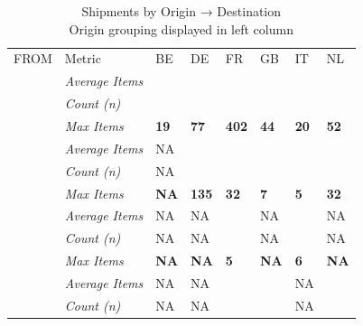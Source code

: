 \documentclass[
  american,
  10,
  a4paper,
]{book}
\theoremstyle{definition}
\theoremstyle{remark}
\begin{document}
\begin{table}
\caption*{
{\large Shipments by Origin → Destination} \\ 
{\small Origin grouping displayed in left column}
} 
\fontsize{12.0pt}{14.4pt}\selectfont
\begin{tabular*}{\linewidth}{@{\extracolsep{\fill}}>{\raggedright\arraybackslash}p{\dimexpr 60.00pt -2\tabcolsep-1.5\arrayrulewidth}>{\raggedright\arraybackslash}p{\dimexpr 90.00pt -2\tabcolsep-1.5\arrayrulewidth}>{\centering\arraybackslash}p{\dimexpr 60.00pt -2\tabcolsep-1.5\arrayrulewidth}>{\centering\arraybackslash}p{\dimexpr 60.00pt -2\tabcolsep-1.5\arrayrulewidth}>{\centering\arraybackslash}p{\dimexpr 60.00pt -2\tabcolsep-1.5\arrayrulewidth}>{\centering\arraybackslash}p{\dimexpr 60.00pt -2\tabcolsep-1.5\arrayrulewidth}>{\centering\arraybackslash}p{\dimexpr 60.00pt -2\tabcolsep-1.5\arrayrulewidth}>{\centering\arraybackslash}p{\dimexpr 60.00pt -2\tabcolsep-1.5\arrayrulewidth}}
\toprule
 &  & \multicolumn{6}{>{\centering\arraybackslash}m{\dimexpr 360.00pt -2\tabcolsep-1.5\arrayrulewidth}}{TO} \\ 
\cmidrule(lr){3-8}
FROM & Metric & BE & DE & FR & GB & IT & NL \\ 
\midrule\addlinespace[2.5pt]
{\bfseries 3P} & {\itshape Average Items} & 14.0 & 18.9 & 97.1 & 17.9 & 10.6 & 18.7 \\ 
{} & {\itshape Count (n)} & 2 & 8 & 13 & 7 & 5 & 11 \\ 
{} & {\itshape Max Items} & {\bfseries 19} & {\bfseries 77} & {\bfseries 402} & {\bfseries 44} & {\bfseries 20} & {\bfseries 52} \\ 
{\bfseries DE} & {\itshape Average Items} & NA & 58.5 & 21.0 & 4.5 & 3.5 & 17.3 \\ 
{} & {\itshape Count (n)} & NA & 4 & 3 & 2 & 2 & 3 \\ 
{} & {\itshape Max Items} & {\bfseries NA} & {\bfseries 135} & {\bfseries 32} & {\bfseries 7} & {\bfseries 5} & {\bfseries 32} \\ 
{\bfseries ES} & {\itshape Average Items} & NA & NA & 2.3 & NA & 5.5 & NA \\ 
{} & {\itshape Count (n)} & NA & NA & 3 & NA & 2 & NA \\ 
{} & {\itshape Max Items} & {\bfseries NA} & {\bfseries NA} & {\bfseries 5} & {\bfseries NA} & {\bfseries 6} & {\bfseries NA} \\ 
{\bfseries FR} & {\itshape Average Items} & NA & NA & 152.0 & 4.0 & NA & 10.0 \\ 
{} & {\itshape Count (n)} & NA & NA & 1 & 1 & NA & 1 \\ 

\end{tabular*}
\end{table}
\end{document}
